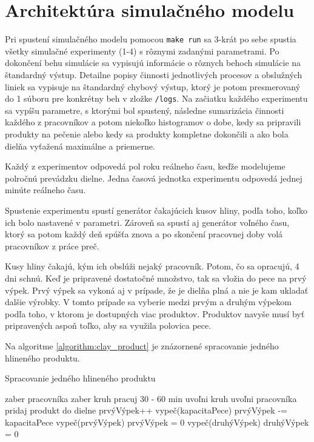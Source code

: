 \documentclass[11pt,a4paper]{article}
\begin{document}
\section{Architektúra simulačného modelu}
Pri spustení simulačného modelu pomocou \texttt{make run} sa 3-krát po sebe spustia všetky simulačné experimenty (1-4) s rôznymi zadanými parametrami. Po dokončení behu simulácie sa vypisujú informácie o rôznych behoch simulácie na štandardný výstup. Detailne popisy činnosti jednotlivých procesov a obslužných liniek sa vypisuje na štandardný chybový výstup, ktorý je potom presmerovaný do 1 súboru pre konkrétny beh v zložke \texttt{/logs}. Na začiatku každého experimentu sa vypíšu parametre, s ktorými bol spustený, následne sumarizácia činnosti každého z pracovníkov a potom niekoľko histogramov o dobe, kedy sa pripravili produkty na pečenie alebo kedy sa produkty kompletne dokončili a ako bola dielňa vyťažená maximálne a priemerne.

Každý z experimentov odpovedá pol roku reálneho času, keďže modelujeme polročnú prevádzku dielne. Jedna časová jednotka experimentu odpovedá jednej minúte reálneho času.

Spustenie experimentu spustí generátor čakajúcich kusov hliny, podľa toho, koľko ich bolo nastavené v parametri. Zároveň sa spustí aj generátor voľného času, ktorý sa potom každý deň spúšťa znova a po skončení pracovnej doby volá pracovníkov z práce preč.

Kusy hliny čakajú, kým ich obslúži nejaký pracovník. Potom, čo sa opracujú, 4 dni schnú. Keď je pripravené dostatočné množstvo, tak sa vložia do pece na prvý výpek. Prvý výpek sa vykoná aj v prípade, že je dielňa plná a nie je kam ukladať dalšie výrobky. V tomto prípade sa vyberie medzi prvým a druhým výpekom podľa toho, v ktorom je dostupných viac produktov. Produktov navyše musí byť pripravených aspoň toľko, aby sa využila polovica pece.

Na algoritme \ref{algorithm:clay_product} je znázornené spracovanie jedného hlineného produktu.

\begin{algorithm}[ht]
    \caption{Spracovanie jedného hlineného produktu}
    {
        {
            zaber pracovníka\;
            zaber kruh\;
            \Break\;
        }
    }
    pracuj 30 - 60 min\;
    uvoľni kruh\;
    uvoľni pracovníka\;
    pridaj produkt do dielne\;
    prvýVýpek++\;
    {
        vypeč(kapacitaPece)\;
        prvýVýpek -= kapacitaPece\;
    }
     {
        vypeč(prvýVýpek)\;
        prvýVýpek = 0\;
    }
     {
        vypeč(druhýVýpek)\;
        druhýVýpek = 0\;
    }
    \End
	\label{algorithm:clay_product}
\end{algorithm}
\end{document}
